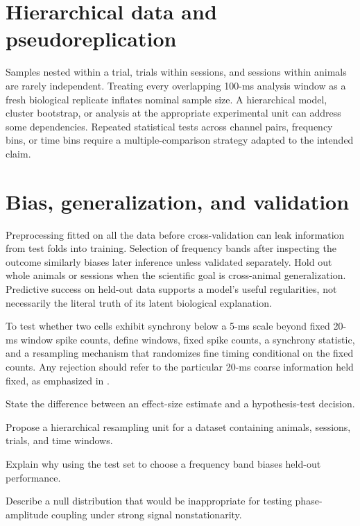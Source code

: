 \section{Hierarchical data and pseudoreplication}
Samples nested within a trial, trials within sessions, and sessions within animals are rarely independent. Treating every overlapping 100-ms analysis window as a fresh biological replicate inflates nominal sample size. A hierarchical model, cluster bootstrap, or analysis at the appropriate experimental unit can address some dependencies. Repeated statistical tests across channel pairs, frequency bins, or time bins require a multiple-comparison strategy adapted to the intended claim.

\section{Bias, generalization, and validation}
Preprocessing fitted on all the data before cross-validation can leak information from test folds into training. Selection of frequency bands after inspecting the outcome similarly biases later inference unless validated separately. Hold out whole animals or sessions when the scientific goal is cross-animal generalization. Predictive success on held-out data supports a model's useful regularities, not necessarily the literal truth of its latent biological explanation.

\begin{workedexample}
To test whether two cells exhibit synchrony below a 5-ms scale beyond fixed 20-ms window spike counts, define windows, fixed spike counts, a synchrony statistic, and a resampling mechanism that randomizes fine timing conditional on the fixed counts. Any rejection should refer to the particular 20-ms coarse information held fixed, as emphasized in \cite{Amarasingham2012}.
\end{workedexample}
\begin{exercises}
\item State the difference between an effect-size estimate and a hypothesis-test decision.
\item Propose a hierarchical resampling unit for a dataset containing animals, sessions, trials, and time windows.
\item Explain why using the test set to choose a frequency band biases held-out performance.
\item Describe a null distribution that would be inappropriate for testing phase-amplitude coupling under strong signal nonstationarity.
\end{exercises}